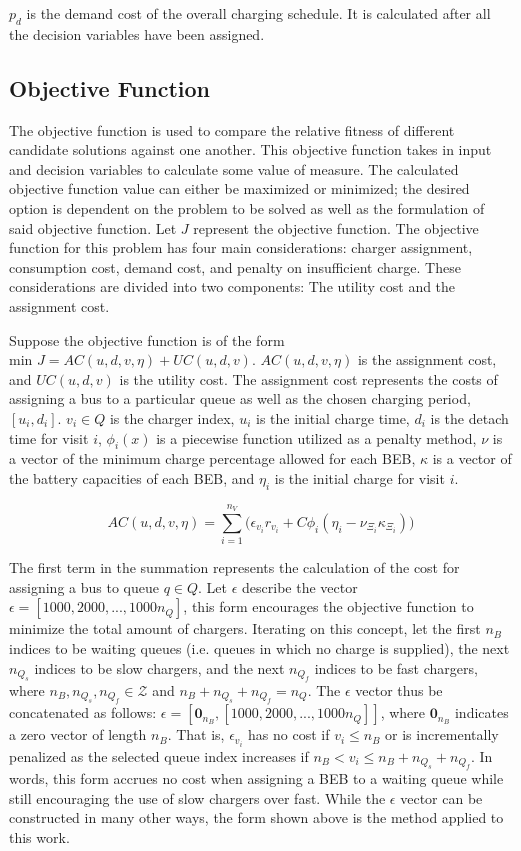 \documentclass[11pt,a4paper,final]{article}
\newcommand{\AC}{AC(u, d, v, \eta)}         %
\newcommand{\UC}{UC(u, d, v)}               %
\newcommand{\Qset}{Q}                       %
\begin{document}
\(p_d\) is the demand cost of the overall charging schedule. It is calculated after all the decision variables have been
assigned.

\subsection{Objective Function}
\label{sec:objective-function}
The objective function is used to compare the relative fitness of different candidate solutions against one another.
This objective function takes in input and decision variables to calculate some value of measure. The calculated
objective function value can either be maximized or minimized; the desired option is dependent on the problem to be
solved as well as the formulation of said objective function. Let \(J\) represent the objective function. The objective
function for this problem has four main considerations: charger assignment, consumption cost, demand cost, and penalty
on insufficient charge. These considerations are divided into two components: The utility cost and the assignment cost.

Suppose the objective function is of the form \(\text{min } J = \AC + \UC\). \(\AC\) is the assignment cost, and \(\UC\) is
the utility cost. The assignment cost represents the costs of assigning a bus to a particular queue as well as the
chosen charging period, \([u_i, d_i]\). \(v_i \in \Qset\) is the charger index, \(u_i\) is the initial charge time, \(d_i\) is the
detach time for visit \(i\), \(\phi_i(x)\) is a piecewise function utilized as a penalty method, \(\nu\) is a vector of the minimum
charge percentage allowed for each BEB, \(\kappa\) is a vector of the battery capacities of each BEB, and \(\eta_i\) is the initial
charge for visit \(i\).

\begin{equation}
\label{eq:ac}
\AC = \sum_{i=1}^{n_V} \Big(\epsilon_{v_i}r_{v_i} + C \phi_i(\eta_i - \nu_{\Xi_i} \kappa_{\Xi_i}) \Big)
\end{equation}

The first term in the summation represents the calculation of the cost for assigning a bus to queue \(q \in Q\). Let \(\epsilon\)
describe the vector \(\epsilon = [1000, 2000, ..., 1000n_Q]\), this form encourages the objective function to minimize the total
amount of chargers. Iterating on this concept, let the first \(n_B\) indices to be waiting queues (i.e. queues in which no
charge is supplied), the next \(n_{Q_s}\) indices to be slow chargers, and the next \(n_{Q_f}\) indices to be fast chargers,
where \(n_B, n_{Q_s}, n_{Q_f} \in \mathcal{Z}\) and \(n_B + n_{Q_s} + n_{Q_f} = n_Q\). The \(\epsilon\) vector thus be concatenated as follows:
\(\epsilon = [\mathbf{0}_{n_B}, [1000, 2000, ..., 1000n_Q]]\), where \(\mathbf{0}_{n_B}\) indicates a zero vector of length \(n_B\).
That is, \(\epsilon_{v_i}\) has no cost if \(v_i \le n_B\) or is incrementally penalized as the selected queue index increases if
\(n_B < v_i \le n_B + n_{Q_s} + n_{Q_f}\). In words, this form accrues no cost when assigning a BEB to a waiting queue while
still encouraging the use of slow chargers over fast. While the \(\epsilon\) vector can be constructed in many other ways, the
form shown above is the method applied to this work.
\end{document}
